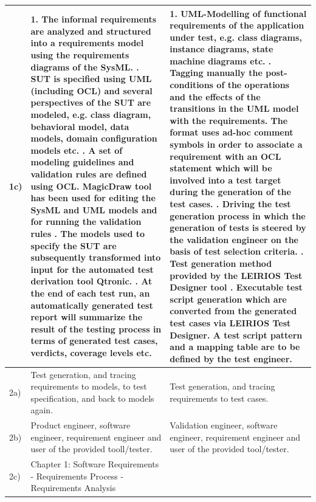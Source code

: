 \begin{landscape}
\begin{small}
\begin{longtable}{ p{0.5cm} | p{11cm} | p{11cm} }
\hline
1c) & 1. The informal requirements are analyzed and structured into a requirements model using the requirements diagrams of the SysML.
\newline 2. SUT is specified using UML (including OCL) and several perspectives of the SUT are modeled, e.g. class diagram, behavioral model, data models, domain configuration models etc. 
\newline 3. A set of modeling guidelines and validation rules are defined using OCL. MagicDraw tool has been used for editing the SysML and UML models and for running the validation rules
\newline 4. The models used to specify the SUT are subsequently transformed into input for the automated test derivation tool Qtronic. 
\newline 5. At the end of each test run, an automatically generated test report will summarize the result of the testing process in terms of generated test cases, verdicts, coverage levels etc.
& 1. UML-Modelling of functional requirements of the application under test, e.g. class diagrams, instance diagrams, state machine diagrams  etc.
\newline2. Tagging manually the post-conditions of the operations and the effects of the transitions in the UML model with the requirements. The format uses ad-hoc comment symbols in order to associate a requirement with an OCL statement which will be involved into a test target during the generation of the test cases.
\newline3. Driving the test generation process in which the generation of tests is steered by the validation engineer on the basis of test selection criteria.
\newline4. Test generation method provided by the LEIRIOS Test Designer tool
\newline5. Executable test script generation which are converted from the generated test cases via LEIRIOS Test Designer. A test script pattern and a mapping table are to be defined by the test engineer.\\
\hline
2a) & Test generation, and tracing requirements to models, to test specification, and back to models again.& Test generation, and tracing requirements to test cases. \\
\hline
2b) & Product engineer, software engineer, requirement engineer and user of the provided tooll/tester.  & Validation engineer, software engineer, requirement engineer and user of the provided tool/tester. \\
\hline
2c) & Chapter 1: Software Requirements
\newline - Requirements Process
\newline - Requirements Analysis

\end{longtable}
\end{small}
\end{landscape}
